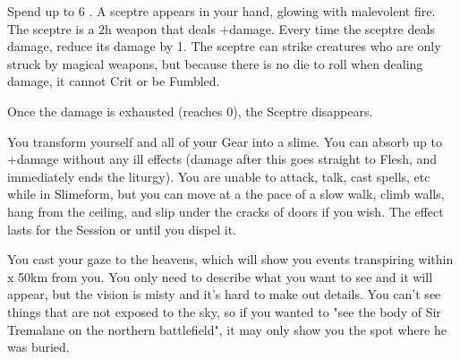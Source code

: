 \begin{multicols*}{2}
\LITURGY [
  Name = Sceptre of Ruin,
  Link = arcana-mystery-lucky-day,
  Paradigm = Ruinous
]

Spend up to 6 \DICE. A sceptre appears in your hand, glowing with malevolent fire. The sceptre is a 2h \FOC weapon that deals \DICE+\DICE damage. Every time the sceptre deals damage, reduce its damage by 1. The sceptre can strike creatures who are only struck by magical weapons, but because there is no die to roll when dealing damage, it cannot Crit or be Fumbled. 

Once the damage is exhausted (reaches 0), the Sceptre disappears.


\LITURGY [
  Name = Slimeform,
  Link = arcana-mystery-slimeform,
  Paradigm = Monstrous
]

You transform yourself and all of your Gear into a slime.  You can absorb up to \SUMDICE+\DICE damage without any ill effects (damage after this goes straight to Flesh, and immediately ends the liturgy).  You are unable to attack, talk, cast spells, etc while in Slimeform, but you can move at a the pace of a slow walk, climb walls, hang from the ceiling, and slip under the cracks of doors if you wish.  The effect lasts for the Session or until you dispel it.


\LITURGY [
  Name = Welkin's Gaze,
  Link = arcana-mystery-welkin-gaze,
  Paradigm = Empyrean
]

You cast your gaze to the heavens, which will show you events transpiring within \DICE x 50km from you. You only need to describe what you want to see and it will appear, but the vision is misty and it's hard to make out details.  You can't see things that are not exposed to the sky, so if you wanted to "see the body of Sir Tremalane on the northern battlefield", it may only show you the spot where he was buried.






\end{multicols*}
